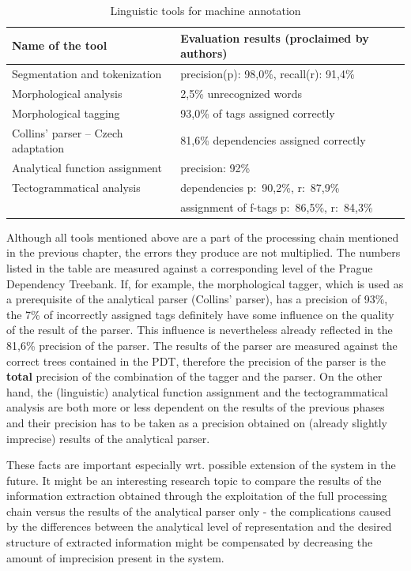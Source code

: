 \begin{table}
\centering
\caption{Linguistic tools for machine annotation}
	\begin{tabular}{l|l}
		Name of the tool & Evaluation results (proclaimed by authors) \\[4pt]
		\hline
	Segmentation and tokenization & precision(p): 98,0\%, recall(r): 91,4\% \\[4pt]
	Morphological analysis & 2,5\% unrecognized words\\
	Morphological tagging & 93,0\% of tags assigned correctly \\[4pt]
	Collins' parser -- Czech adaptation & 81,6\% dependencies assigned correctly\\
	Analytical function assignment & precision: 92\% \\[4pt]
	Tectogrammatical analysis & dependencies p:~90,2\%, r:~87,9\%\\
	\hspace*{0.2cm} \citep{biblio:KlTransformationBasedTectogrammatical2006} & assignment of f-tags p:~86,5\%, r:~84,3\%\\
	\end{tabular}
\label{tab:ling_tools}
\end{table}





\noindent Although all tools mentioned above are a part of the processing chain mentioned in the previous chapter, the errors they produce are not multiplied. The numbers listed in the table are measured against a corresponding level of the Prague Dependency Treebank. If, for example, the morphological tagger, which is used as a prerequisite of the analytical parser (Collins' parser), has a precision of 93\%, the 7\% of incorrectly assigned tags definitely have some influence on the quality of the result of the parser. This influence is nevertheless already reflected in the 81,6\% precision of the parser. The results of the parser are measured against the correct trees contained in the PDT, therefore the precision of the parser is the \textbf{total} precision of the combination of the tagger and the parser. On the other hand, the (linguistic) analytical function assignment and the tectogrammatical analysis are both more or less dependent on the results of the previous phases and their precision has to be taken as a precision obtained on (already slightly imprecise) results of the analytical parser.

These facts are important especially wrt. possible extension of the system in the future. It might be an interesting research topic to compare the results of the information extraction obtained through the exploitation of the full processing chain versus the results of the analytical parser only - the complications caused by the differences between the analytical level of representation and the desired structure of extracted information might be compensated by decreasing the amount of imprecision present in the system.     



